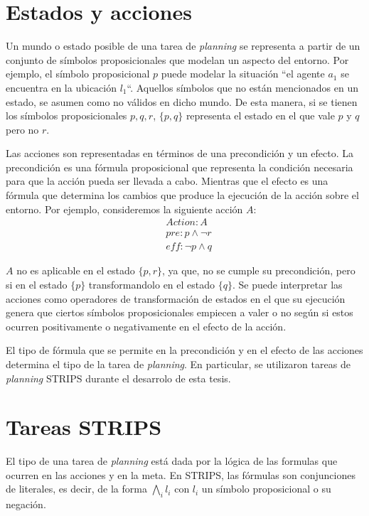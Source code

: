 \section{Estados y acciones}

Un mundo o estado  posible de una tarea de \emph{planning} se representa a
partir de un conjunto de símbolos proposicionales que modelan un aspecto del
entorno. Por ejemplo, el símbolo proposicional $p$ puede modelar la situación
``el agente $a_1$ se encuentra en la ubicación $l_1$``. Aquellos símbolos  que
no están mencionados en un estado, se asumen como no válidos en dicho mundo. De
esta manera, si se tienen los símbolos proposicionales $p,q,r$, $\{p, q\}$
representa el estado en el que vale $p$ y $q$ pero no $r$.

Las acciones son representadas en términos de una precondición y un efecto. La
precondición es una fórmula proposicional que representa la condición necesaria
para que la acción pueda ser llevada a cabo. Mientras que el efecto es una
fórmula que determina los cambios que produce la ejecución de la acción sobre el
entorno. Por ejemplo, consideremos la siguiente acción $A$:
\begin{align*}
    & Action : A \\
    & pre : p \land \neg r \\
    & eff : \neg p \land q
\end{align*}

$A$ no es aplicable en el estado $\{p, r\}$, ya que, no se cumple su
precondición, pero si en el estado $\{p\}$ transformandolo en el estado $\{q\}$. Se puede interpretar las acciones como operadores de transformación de
estados en el que su ejecución genera que ciertos símbolos proposicionales
empiecen a valer o no según si estos ocurren positivamente o negativamente en el
efecto de la acción.

El tipo de fórmula que se permite en la precondición y en el efecto de las
acciones determina el tipo de la tarea de \emph{planning}. En particular, se
utilizaron tareas de \emph{planning} STRIPS durante el desarrolo de esta tesis.

\section{Tareas STRIPS}

El tipo de una tarea de \emph{planning} está dada por la lógica de las formulas
que ocurren en las acciones y en la meta. En STRIPS, las fórmulas son
conjunciones de literales, es decir, de la forma $\bigwedge_i l_i$ con $l_i$
un símbolo proposicional o su negación.

